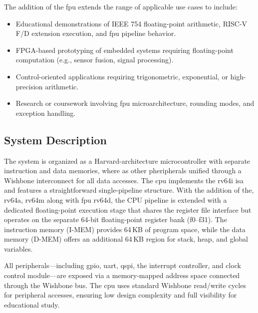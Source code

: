 \begin{itemize}
            The addition of the \gls{fpu} extends the range of applicable use cases to
            include:

            \begin{itemize}
                  \item Educational demonstrations of IEEE 754 floating-point arithmetic, RISC-V F/D
                        extension execution, and \gls{fpu} pipeline behavior.
                  \item FPGA-based prototyping of embedded systems requiring floating-point computation
                        (e.g., sensor fusion, signal processing).
                  \item Control-oriented applications requiring trigonometric, exponential, or
                        high-precision arithmetic.
                  \item Research or coursework involving \gls{fpu} microarchitecture, rounding modes,
                        and exception handling.

            \end{itemize}

            \subsection{System Description}
            The system is organized as a \gls{Harvard}-architecture microcontroller with
            separate instruction and data memories, where as other pheripherals unified
            through a Wishbone interconnect for all data accesses. The \gls{cpu} implements
            the \gls{rv64i} \gls{isa} and features a straightforward single-\gls{pipeline}
            structure. With the addition of the, \gls{rv64a}, \gls{rv64m} along with
            \gls{fpu} \gls{rv64d}, the CPU pipeline is extended with a dedicated
            floating-point execution stage that shares the register file interface but
            operates on the separate 64-bit floating-point register bank (f0–f31). The
            instruction memory (\gls{I-MEM}) provides 64\,KB of program space, while the
            data memory (\gls{D-MEM}) offers an additional 64\,KB region for stack, heap,
            and global variables.

            All peripherals—including \gls{gpio}, \gls{uart}, \gls{qspi}, the interrupt
            controller, and clock control module—are exposed via a memory-mapped address
            space connected through the Wishbone bus. The \gls{cpu} uses standard Wishbone
            read/write cycles for peripheral accesses, ensuring low design complexity and
            full visibility for educational study.


\end{itemize}
